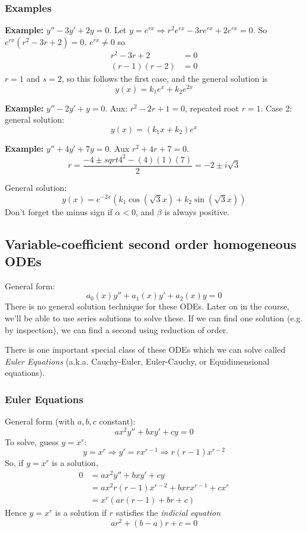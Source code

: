 \documentclass[11pt]{article}
\newcommand{\example}{\textbf{Example: }}
\begin{document}
\subsubsection{Examples}
	\example $y'' - 3y' + 2y = 0$. Let $y = e^{rx} \Rightarrow r^2 e^{rx} - 3re^{rx} + 2 e^{rx} = 0$. So $e^{rx} (r^2 - 3r + 2) = 0$. $e^{rx} \neq 0$ so
		\begin{align*}
			r^2 - 3r + 2 &= 0 \\
			(r-1)(r-2) &= 0
		\end{align*}
	$r = 1$ and $s = 2$, so this follows the first case, and the general solution is
		$$ y(x) = k_1 e^x + k_2 e^{2x} $$

	\example $y'' - 2y' + y = 0$. Aux: $r^2 - 2r + 1 = 0$, repeated root $r = 1$. Case 2: general solution:
		$$ y(x) = (k_1 x + k_2) e^x $$

	\example $y'' + 4y' + 7y = 0$. Aux $r^2 + 4r + 7 = 0$.
		$$ r = \frac{-4 \pm sqrt{4^2 - (4)(1)(7)}}{2} = -2 \pm i \sqrt{3} $$

	General solution:
		$$ y(x) = e^{-2x} (k_1 \cos(\sqrt{3} x) + k_2 \sin(\sqrt{3} x)) $$
	Don't forget the minus sign if $\alpha < 0$, and $\beta$ is always positive.

\subsection{Variable-coefficient second order homogeneous ODEs}
	General form:
		$$ a_0(x) y'' + a_1 (x) y' + a_2 (x) y = 0 $$
	There is no general solution technique for these ODEs. Later on in the course, we'll be able to use series solutions to solve these. If we can find one solution (e.g. by inspection), we can find a second using reduction of order.

	There is one important special class of these ODEs which we can solve called \emph{Euler Equations} (a.k.a. Cauchy-Euler, Euler-Cauchy, or Equidimensional equations).

\subsubsection{Euler Equations}
	General form (with $a,b,c$ constant):
		$$ ax^2 y'' + b x y' + c y = 0 $$
	To solve, guess $y = x^r$:
		$$ y = x^r \Rightarrow y' = rx^{r-1} \Rightarrow r(r-1)x^{r-2} $$
	So, if $y = x^r$ is a solution,
		\begin{align*}
			0 &= ax^2y'' + bxy' + cy \\
				&= ax^2 r (r-1) x^{r-2} + b x r x^{r-1} + c x^r \\
				&= x^r (a r(r-1) + br + c)
		\end{align*}
	Hence $y = x^r$ is a solution if $r$ satisfies the \emph{indicial equation}
		$$ a r^2 + (b-a) r + c = 0 $$
\end{document}
